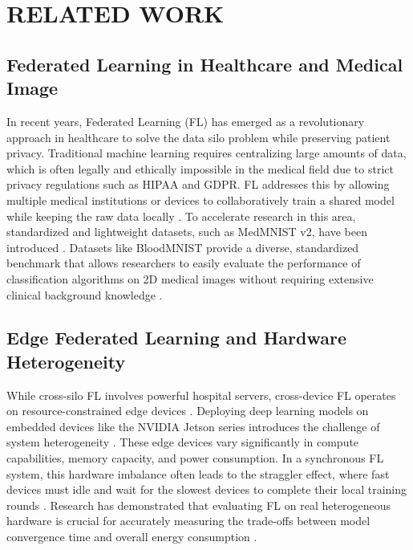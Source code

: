 
\chapter{RELATED WORK}
\label{ch:related_work}

\ifpdf
    \graphicspath{{Chapter2/Figs/Raster/}{Chapter2/Figs/PDF/}{Chapter2/Figs/}}
\else
    \graphicspath{{Chapter2/Figs/Vector/}{Chapter2/Figs/}}
\fi

\section{Federated Learning in Healthcare and Medical Image}
In recent years, Federated Learning (FL) has emerged as a revolutionary approach in healthcare to solve the data silo problem while preserving patient privacy. Traditional machine learning requires centralizing large amounts of data, which is often legally and ethically impossible in the medical field due to strict privacy regulations such as HIPAA and GDPR. FL addresses this by allowing multiple medical institutions or devices to collaboratively train a shared model while keeping the raw data locally \cite{le2024federated}. To accelerate research in this area, standardized and lightweight datasets, such as MedMNIST v2, have been introduced \cite{yang2023medmnist}. Datasets like BloodMNIST provide a diverse, standardized benchmark that allows researchers to easily evaluate the performance of classification algorithms on 2D medical images without requiring extensive clinical background knowledge \cite{yang2023medmnist}.

\section{Edge Federated Learning and Hardware Heterogeneity}
While cross-silo FL involves powerful hospital servers, cross-device FL operates on resource-constrained edge devices \cite{kairouz2021advances}. Deploying deep learning models on embedded devices like the NVIDIA Jetson series introduces the challenge of system heterogeneity \cite{beutel2020flower}. These edge devices vary significantly in compute capabilities, memory capacity, and power consumption. In a synchronous FL system, this hardware imbalance often leads to the straggler effect, where fast devices must idle and wait for the slowest devices to complete their local training rounds \cite{kairouz2021advances}. Research has demonstrated that evaluating FL on real heterogeneous hardware is crucial for accurately measuring the trade-offs between model convergence time and overall energy consumption \cite{beutel2020flower}.

